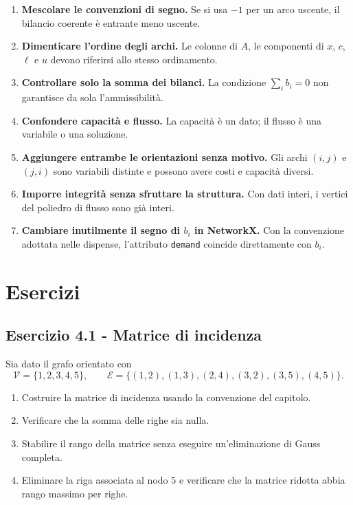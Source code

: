 \documentclass[11pt,a4paper]{article}
\newcommand{\V}{\mathcal{V}}
\newcommand{\E}{\mathcal{E}}
\begin{document}
\begin{enumerate}[label=\arabic*.]
  \item \textbf{Mescolare le convenzioni di segno.} Se si usa $-1$ per un arco uscente, il bilancio coerente è entrante meno uscente.
  \item \textbf{Dimenticare l'ordine degli archi.} Le colonne di $A$, le componenti di $x$, $c$, $\ell$ e $u$ devono riferirsi allo stesso ordinamento.
  \item \textbf{Controllare solo la somma dei bilanci.} La condizione $\sum_i b_i=0$ non garantisce da sola l'ammissibilità.
  \item \textbf{Confondere capacità e flusso.} La capacità è un dato; il flusso è una variabile o una soluzione.
  \item \textbf{Aggiungere entrambe le orientazioni senza motivo.} Gli archi $(i,j)$ e $(j,i)$ sono variabili distinte e possono avere costi e capacità diversi.
  \item \textbf{Imporre integrità senza sfruttare la struttura.} Con dati interi, i vertici del poliedro di flusso sono già interi.
  \item \textbf{Cambiare inutilmente il segno di $b_i$ in NetworkX.} Con la convenzione adottata nelle dispense, l'attributo \texttt{demand} coincide direttamente con $b_i$.
\end{enumerate}

\section{Esercizi}

\subsection*{Esercizio 4.1 - Matrice di incidenza}

Sia dato il grafo orientato con
\[
\V=\{1,2,3,4,5\},\qquad
\E=\{(1,2),(1,3),(2,4),(3,2),(3,5),(4,5)\}.
\]
\begin{enumerate}[label=(\alph*)]
  \item Costruire la matrice di incidenza usando la convenzione del capitolo.
  \item Verificare che la somma delle righe sia nulla.
  \item Stabilire il rango della matrice senza eseguire un'eliminazione di Gauss completa.
  \item Eliminare la riga associata al nodo 5 e verificare che la matrice ridotta abbia rango massimo per righe.
\end{enumerate}
\end{document}
